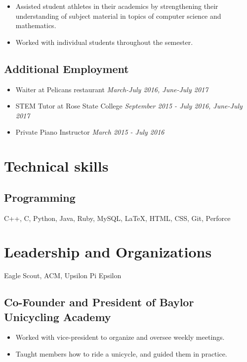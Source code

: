 \documentclass{article}
\begin{document}
\begin{itemize}
	\itemsep0em
	\item Assisted student athletes in their academics by strengthening their understanding of subject material in topics of computer science and mathematics.
	
	\item Worked with individual students throughout the semester. 
\end{itemize}
  
\subsection{Additional Employment}
\begin{itemize}
	\itemsep0em
	\item Waiter at Pelicans restaurant \hfill\textit{March-July 2016, June-July 2017} 
	
	\item STEM Tutor at Rose State College \hfill\textit{September 2015 - July 2016, June-July 2017} 
	
	\item Private Piano Instructor \hfill\textit{March 2015 - July 2016}
\end{itemize}

\section{Technical skills}

\subsection{Programming}

C++, C, Python, Java, Ruby, MySQL, {\LaTeX}, HTML, CSS, Git, Perforce

\section{Leadership and Organizations}
Eagle Scout, ACM, Upsilon Pi Epsilon 
\subsection{Co-Founder and President of Baylor Unicycling Academy}
\begin{itemize}
	\itemsep0em
	\item Worked with vice-president to organize and oversee weekly meetings. 
	\item Taught members how to ride a unicycle, and guided them in practice.
\end{itemize}
\noindent
\end{document}
